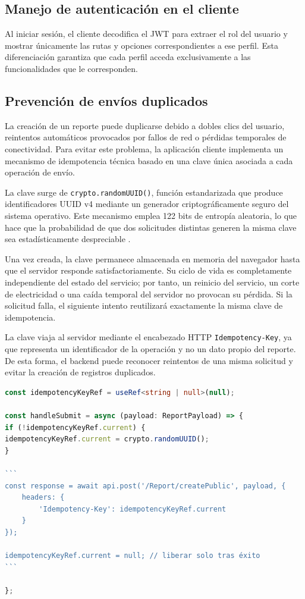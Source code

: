 \subsection{Manejo de autenticación en el cliente}

Al iniciar sesión, el cliente decodifica el JWT para extraer el rol del usuario y mostrar únicamente las rutas y opciones correspondientes a ese perfil. 
Esta diferenciación garantiza que cada perfil acceda exclusivamente a las funcionalidades que le corresponden.


\subsection{Prevención de envíos duplicados}

La creación de un reporte puede duplicarse debido a dobles clics del usuario, reintentos automáticos provocados por fallos de red o pérdidas temporales de conectividad. 
Para evitar este problema, la aplicación cliente implementa un mecanismo de idempotencia técnica basado en una clave única asociada a cada operación de envío.

La clave surge de \texttt{crypto.randomUUID()}, función estandarizada que produce identificadores UUID v4 mediante un generador criptográficamente seguro del sistema operativo.
Este mecanismo emplea 122 bits de entropía aleatoria, lo que hace que la probabilidad de que dos solicitudes distintas generen la misma clave sea estadísticamente despreciable \cite{w3c_uuid}.

Una vez creada, la clave permanece almacenada en memoria del navegador hasta que el servidor responde satisfactoriamente. 
Su ciclo de vida es completamente independiente del estado del servicio; por tanto, un reinicio del servicio, un corte de electricidad o una caída temporal del servidor no provocan su pérdida. Si la solicitud falla, el siguiente intento reutilizará exactamente la misma clave de idempotencia.

La clave viaja al servidor mediante el encabezado HTTP \texttt{Idempotency-Key}, ya que representa un identificador de la operación y no un dato propio del reporte. 
De esta forma, el backend puede reconocer reintentos de una misma solicitud y evitar la creación de registros duplicados.

\begin{lstlisting}[language={TypeScript}, caption={Generación y envío de la clave de idempotencia}, label={lst:idempotency_key}]
const idempotencyKeyRef = useRef<string | null>(null);

const handleSubmit = async (payload: ReportPayload) => {
if (!idempotencyKeyRef.current) {
idempotencyKeyRef.current = crypto.randomUUID();
}

```
const response = await api.post('/Report/createPublic', payload, {
    headers: {
        'Idempotency-Key': idempotencyKeyRef.current
    }
});

idempotencyKeyRef.current = null; // liberar solo tras éxito
```

};
\end{lstlisting}




